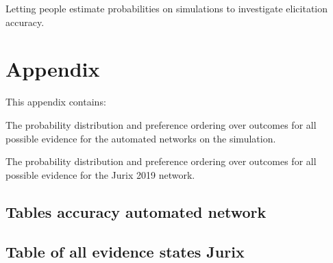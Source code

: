 \documentclass[12pt]{article}
\begin{document}
Letting people estimate probabilities on simulations to investigate elicitation accuracy.

\newpage



\newpage
\section*{Appendix}

This appendix contains:

The probability distribution and preference ordering over outcomes for all possible evidence for the automated networks on the simulation.

The probability distribution and preference ordering over outcomes for all possible evidence for the Jurix 2019 network.

\newpage
\subsection{Tables accuracy automated network}


\subsection{Table of all evidence states Jurix}

\end{document}
